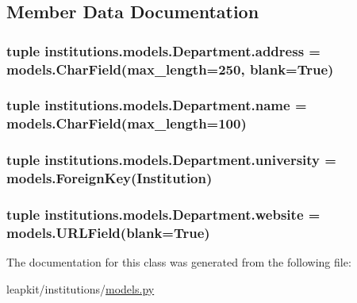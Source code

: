 \subsection{Member Data Documentation}
\hypertarget{classinstitutions_1_1models_1_1_department_abfc146b0adecf2f352b698266a457a25}{
\subsubsection[{address}]{\setlength{\rightskip}{0pt plus 5cm}tuple institutions.\-models.\-Department.\-address = models.\-Char\-Field(max\-\_\-length=250, blank=True)\hspace{0.3cm}{\ttfamily [static]}}}\label{classinstitutions_1_1models_1_1_department_abfc146b0adecf2f352b698266a457a25}
\hypertarget{classinstitutions_1_1models_1_1_department_af0ed86723f8dd650bc247e0031040ab5}{
\subsubsection[{name}]{\setlength{\rightskip}{0pt plus 5cm}tuple institutions.\-models.\-Department.\-name = models.\-Char\-Field(max\-\_\-length=100)\hspace{0.3cm}{\ttfamily [static]}}}\label{classinstitutions_1_1models_1_1_department_af0ed86723f8dd650bc247e0031040ab5}
\hypertarget{classinstitutions_1_1models_1_1_department_a795e142ad93251bbbb48c2d6876da66b}{
\subsubsection[{university}]{\setlength{\rightskip}{0pt plus 5cm}tuple institutions.\-models.\-Department.\-university = models.\-Foreign\-Key({\bf Institution})\hspace{0.3cm}{\ttfamily [static]}}}\label{classinstitutions_1_1models_1_1_department_a795e142ad93251bbbb48c2d6876da66b}
\hypertarget{classinstitutions_1_1models_1_1_department_ae65b989d60e9675953738611a7155fd8}{
\subsubsection[{website}]{\setlength{\rightskip}{0pt plus 5cm}tuple institutions.\-models.\-Department.\-website = models.\-U\-R\-L\-Field(blank=True)\hspace{0.3cm}{\ttfamily [static]}}}\label{classinstitutions_1_1models_1_1_department_ae65b989d60e9675953738611a7155fd8}


The documentation for this class was generated from the following file\-:\begin{DoxyCompactItemize}
\item 
leapkit/institutions/\hyperlink{institutions_2models_8py}{models.\-py}\end{DoxyCompactItemize}
